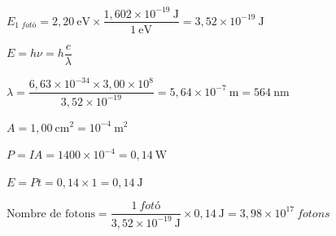 \begin{solapartat}
 $E_{\textit{1 fotó}} = 2,20\ \mathrm{eV}\times\dfrac{1,602\times 10^{-19}\ \mathrm{J}}{1\ \mathrm{eV}} = 3,52\times 10^{-19}\ \mathrm{J}$

 $E = h\nu = h\dfrac{c}{\lambda}$

 $\lambda = \dfrac{6,63\times 10^{-34}\times 3,00\times 10^{8}}{3,52\times 10^{-19}} = 5,64\times 10^{-7}\ \mathrm{m} = 564\ \mathrm{nm}$
\end{solapartat}

\begin{solapartat}
 $A = 1,00\ \mathrm{cm^2} = 10^{-4}\ \mathrm{m^2}$

 $P = IA = 1400\times 10^{-4} = 0,14\ \mathrm{W}$

 $E = Pt = 0,14\times 1 = 0,14\ \mathrm{J}$

 $\text{Nombre de fotons} = \dfrac{1\ \textit{fotó}}{3,52\times 10^{-19}\ \mathrm{J}}\times 0,14\ \mathrm{J} = 3,98\times 10^{17}\ \textit{fotons}$
\end{solapartat}
